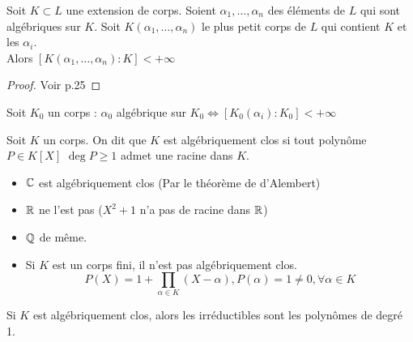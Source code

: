 \documentclass[]{report}
\begin{document}
    \begin{prop}{}{}
        Soit $K\subset L$ une extension de corps. Soient $\alpha_1,\dots,\alpha_n$ des éléments de $L$ qui sont algébriques sur $K$. Soit $K(\alpha_1,\dots,\alpha_n)$ le plus petit corps de $L$ qui contient $K$ et les $\alpha_i$. \\
        Alors $[K(\alpha_1,\dots,\alpha_n):K]<+\infty$
    \end{prop}

    \begin{proof}
        Voir p.25
    \end{proof}


    \begin{ra}{}{}
        Soit $K_0$ un corps : $\alpha_0$ algébrique sur $K_0\iff [K_0(\alpha_i):K_0]<+\infty$
    \end{ra}

    \begin{df}{}{}
        Soit $K$ un corps. On dit que $K$ est algébriquement clos si tout polynôme $P\in K[X]$ \tq $\deg P\ge1$ admet une racine dans $K$.
    \end{df}

    \begin{ex}{}{}
        \begin{itemize}
            \item $\mathbb{C}$ est algébriquement clos (Par le théorème de d'Alembert)
            \item $\mathbb{R}$ ne l'est pas ($X^2+1$ n'a pas de racine dans $\mathbb{R}$)
            \item $\mathbb{Q}$ de même.
            \item Si $K$ est un corps fini, il n'est pas algébriquement clos.
            $$P(X)=1+\prod_{\alpha\in K}(X-\alpha),P(\alpha)=1\neq 0, \forall \alpha \in K$$
        \end{itemize}
    \end{ex}

    \begin{lm}{}{}
        Si $K$ est algébriquement clos, alors les irréductibles sont les polynômes de degré 1.
    \end{lm}
\end{document}
